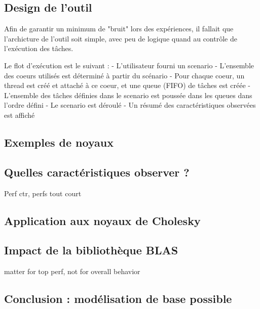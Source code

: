 \subsection{Design de l'outil}

Afin de garantir un minimum de "bruit" lors des expériences, il fallait que l'archicture de l'outil soit simple, avec peu de logique quand au contrôle de l'exécution des tâches.

Le flot d'exécution est le suivant :
 - L'utilisateur fourni un scenario
 - L'ensemble des coeurs utilisés est déterminé à partir du scénario
 - Pour chaque coeur, un thread est créé et attaché à ce coeur, et une queue (FIFO) de tâches est créée
 - L'ensemble des tâches définies dans le scenario est poussée dans les queues dans l'ordre défini
 - Le scenario est déroulé
 - Un résumé des caractéristiques observées est affiché

\subsection{Exemples de noyaux}


\subsection{Quelles caractéristiques observer ?}
Perf ctr, perfs tout court

\subsection{Application aux noyaux de Cholesky}
\subsection{Impact de la bibliothèque BLAS}

matter for top perf, not for overall behavior

\subsection{Conclusion : modélisation de base possible}


